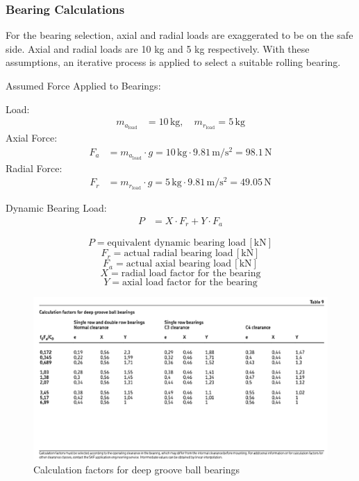 \documentclass[12pt]{article}
\begin{document}
\subsubsection{Bearing Calculations}

For the bearing selection, axial and radial loads are exaggerated to be on the safe side. Axial and radial loads are 10 kg and 5 kg respectively. With these assumptions, an iterative process is applied to select a suitable rolling bearing.

Assumed Force Applied to Bearings:

Load:
\begin{align}
    m_{a_{\text{load}}} &= 10 \, \mathrm{kg}, \quad m_{r_{\text{load}}} = 5 \, \mathrm{kg}
\end{align}
Axial Force: 
\begin{align}
    F_a &= m_{a_{\text{load}}} \cdot g = 10 \, \mathrm{kg} \cdot 9.81 \, \mathrm{m/s^2} = 98.1 \, \mathrm{N}
\end{align}
Radial Force: 
\begin{align}
    F_r &= m_{r_{\text{load}}} \cdot g = 5 \, \mathrm{kg} \cdot 9.81 \, \mathrm{m/s^2} = 49.05 \, \mathrm{N}
\end{align}

Dynamic Bearing Load:
\begin{align}
    P &= X \cdot F_r + Y \cdot F_a
\end{align}


\[
P = \text{equivalent dynamic bearing load} \, [\mathrm{kN}]
\]
\[
F_r = \text{actual radial bearing load} \, [\mathrm{kN}]
\]
\[
F_a = \text{actual axial bearing load} \, [\mathrm{kN}]
\]
\[
X = \text{radial load factor for the bearing}
\]
\[
Y = \text{axial load factor for the bearing}
\]


\begin{figure}[h]
    \centering
    \includegraphics[width=0.8\linewidth]{bearingfactors.png}
    \caption{Calculation factors for deep groove ball bearings}
    \label{fig:bearingfactors}
\end{figure}
\end{document}
